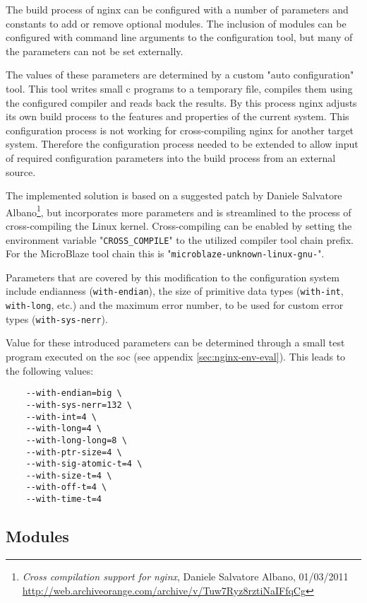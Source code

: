 The build process of nginx can be configured with a number of parameters and constants to add or remove optional modules. The inclusion of modules can be configured with command line arguments to the configuration tool, but many of the parameters can not be set externally.

The values of these parameters are determined by a custom "auto configuration" tool. This tool writes small c programs to a temporary file, compiles them using the configured compiler and reads back the results. By this process nginx adjusts its own build process to the features and properties of the current system. This configuration process is not working for cross-compiling nginx for another target system. Therefore the configuration process needed to be extended to allow input of required configuration parameters into the build process from an external source.

The implemented solution is based on a suggested patch by Daniele Salvatore Albano\footnote{\textit{Cross compilation support for nginx}, Daniele Salvatore Albano, 01/03/2011 \url{http://web.archiveorange.com/archive/v/Tuw7Ryz8rztiNaIFfqCg}}, but incorporates more parameters and is streamlined to the process of cross-compiling the Linux kernel. Cross-compiling can be enabled by setting the environment variable "\texttt{CROSS\_COMPILE}" to the utilized compiler tool chain prefix. For the MicroBlaze tool chain this is "\texttt{microblaze-unknown-linux-gnu-}".

Parameters that are covered by this modification to the configuration system include endianness (\texttt{with-endian}), the size of primitive data types (\texttt{with-int}, \texttt{with-long}, etc.) and the maximum error number, to be used for custom error types (\texttt{with-sys-nerr}).

Value for these introduced parameters can be determined through a small test program executed on the \gls{soc} (see appendix \ref{sec:nginx-env-eval}). This leads to the following values:

\begin{verbatim}
    --with-endian=big \
    --with-sys-nerr=132 \
    --with-int=4 \
    --with-long=4 \
    --with-long-long=8 \
    --with-ptr-size=4 \
    --with-sig-atomic-t=4 \
    --with-size-t=4 \
    --with-off-t=4 \
    --with-time-t=4
\end{verbatim}

\subsection{Modules}


